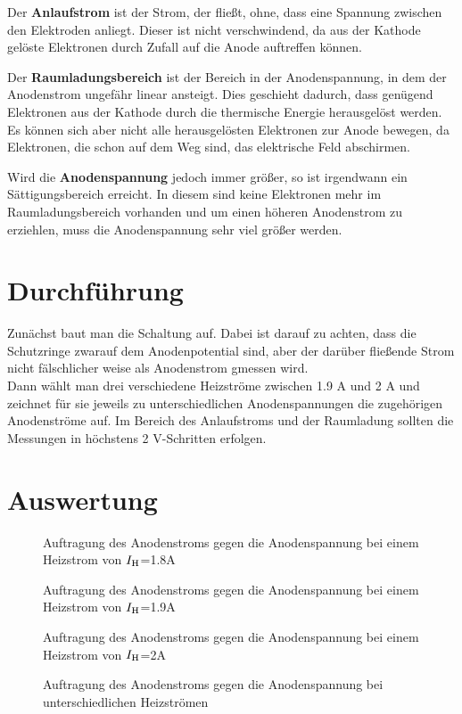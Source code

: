 \documentclass[12pt,a4paper,titlepage,headinclude,bibtotoc]{scrartcl}
\begin{document}
Der \textbf{Anlaufstrom} ist der Strom, der fließt, ohne, dass eine Spannung zwischen den Elektroden anliegt.
Dieser ist nicht verschwindend, da aus der Kathode gelöste Elektronen durch Zufall auf die Anode auftreffen können.

Der \textbf{Raumladungsbereich} ist der Bereich in der Anodenspannung, in dem der Anodenstrom ungefähr linear ansteigt.
Dies geschieht dadurch, dass genügend Elektronen aus der Kathode durch die thermische Energie herausgelöst werden.
Es können sich aber nicht alle herausgelösten Elektronen zur Anode bewegen, da Elektronen, die schon auf dem Weg sind, das elektrische Feld abschirmen.

Wird die \textbf{Anodenspannung} jedoch immer größer, so ist irgendwann ein Sättigungsbereich erreicht.
In diesem sind keine Elektronen mehr im Raumladungsbereich vorhanden und um einen höheren Anodenstrom zu erziehlen, muss die Anodenspannung sehr viel größer werden.



\section{Durchführung}
\label{sec:durchfuehrung}
Zunächst baut man die Schaltung auf.
Dabei ist darauf zu achten, dass die Schutzringe zwarauf dem Anodenpotential sind, aber der darüber fließende Strom nicht fälschlicher weise als Anodenstrom gmessen wird.\\
Dann wählt man drei verschiedene Heizströme zwischen 1.9 A und 2 A und zeichnet für sie jeweils zu unterschiedlichen Anodenspannungen die zugehörigen Anodenströme auf.
Im Bereich des Anlaufstroms und der Raumladung sollten die Messungen in höchstens 2 V-Schritten erfolgen.

\section{Auswertung}
\label{sec:auswertung}
\begin{figure}[!h]
	\centering
	
	\caption{Auftragung des Anodenstroms gegen die Anodenspannung bei einem Heizstrom von $I_\text H$=1.8A}
	\label{fig:h18}
\end{figure}
\begin{figure}[!h]
	\centering
	
	\caption{Auftragung des Anodenstroms gegen die Anodenspannung bei einem Heizstrom von $I_\text H$=1.9A}
	\label{fig:h19}
\end{figure}
\begin{figure}[!h]
	\centering
	
	\caption{Auftragung des Anodenstroms gegen die Anodenspannung bei einem Heizstrom von $I_\text H$=2A}
	\label{fig:h2}
\end{figure}
\begin{figure}[!h]
	\centering
	
	\caption{Auftragung des Anodenstroms gegen die Anodenspannung bei unterschiedlichen Heizströmen}
	\label{fig:h}
\end{figure}
\end{document}
